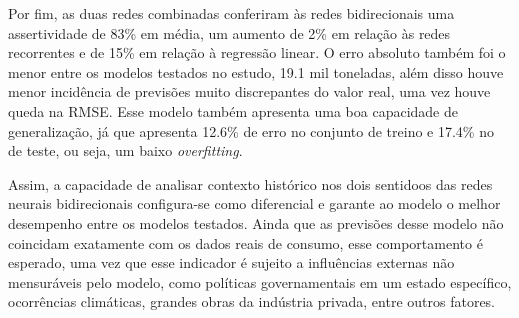 Por fim, as duas redes combinadas conferiram às redes bidirecionais uma 
assertividade de 83\% em média, um aumento de 2\% em relação às redes recorrentes e de
15\% em relação à regressão linear. O erro absoluto também foi o menor entre 
os modelos testados no estudo, 19.1 mil toneladas, além disso houve menor 
incidência de previsões muito discrepantes do valor real, uma vez houve queda
na RMSE. Esse modelo também apresenta uma boa capacidade de generalização, 
já que apresenta 12.6\% de erro no conjunto de treino e 17.4\% no de teste,
ou seja, um baixo \textit{overfitting}.

Assim, a capacidade de analisar contexto histórico nos dois sentidoos das redes
neurais bidirecionais configura-se como diferencial e garante ao modelo o 
melhor desempenho entre os modelos testados. Ainda que as previsões desse modelo 
não coincidam exatamente com os dados reais de consumo, esse comportamento é 
esperado, uma vez que esse indicador é sujeito a 
influências externas não mensuráveis pelo modelo, como políticas governamentais
em um estado específico, ocorrências climáticas, grandes obras da indústria
privada, entre outros fatores.
